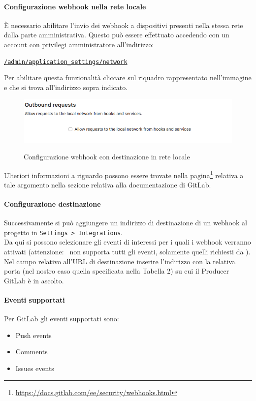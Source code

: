 	\paragraph{Configurazione webhook nella rete locale}
	È necessario abilitare l'invio dei webhook a dispositivi presenti nella stessa rete dalla parte amministrativa.
	Questo può essere effettuato accedendo con un account con privilegi amministratore all'indirizzo:
	\begin{center}
		\texttt{\url{/admin/application_settings/network}}
	\end{center}
	Per abilitare questa funzionalità cliccare sul riquadro rappresentato nell'immagine e che si trova all'indirizzo sopra indicato.
	\begin{figure}[H]
		\centering
		\includegraphics[width=13cm]{img/webhook_gitlab_setup.png}\\
		\caption{Configurazione webhook con destinazione in rete locale}
	\end{figure}
	Ulteriori informazioni a riguardo possono essere trovate nella pagina\footnote{\url{https://docs.gitlab.com/ee/security/webhooks.html}} relativa a tale argomento nella sezione relativa alla documentazione di GitLab.	

	\paragraph{Configurazione destinazione}
	Successivamente si può aggiungere un indirizzo di destinazione di un webhook al progetto in \texttt{Settings > Integrations}.\\
	Da qui si possono selezionare gli eventi di interessi per i quali i webhook verranno attivati (attenzione: \progetto~non supporta tutti gli eventi, solamente quelli richiesti da \II).\\
	Nel campo relativo all'URL di destinazione inserire l'indirizzo con la relativa porta (nel nostro caso quella specificata nella Tabella 2) su cui il Producer GitLab è in ascolto.
	\paragraph{Eventi supportati}
	Per GitLab gli eventi supportati sono:
	\begin{itemize}
		\item Push events
		\item Comments
		\item Issues events
	\end{itemize}

